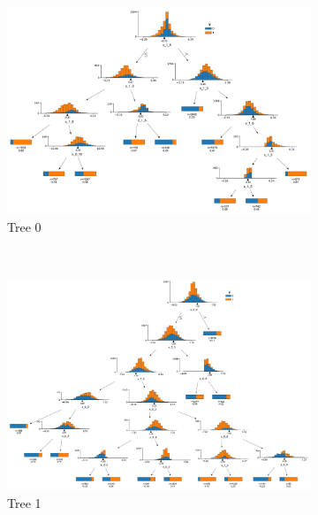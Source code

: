 \begin{landscape}
\begin{figure}[H]
  \centering
  \begin{subfigure}[b]{0.32\linewidth}\centering
      \includegraphics[width=\textwidth]{figures/ml/figs_demo/dtreeviz_figs_0}
  \caption{Tree 0}
  \label{fig:FIGS:demo_trees:tree0}
  \end{subfigure}
  ~
  \begin{subfigure}[b]{0.32\linewidth}\centering
      \includegraphics[width=\textwidth]{figures/ml/figs_demo/dtreeviz_figs_1}
  \caption{Tree 1}
  \label{fig:FIGS:demo_trees:tree1}
  \end{subfigure}
  ~
  \begin{subfigure}[b]{0.32\linewidth}\centering

\end{subfigure}
\end{figure}
\end{landscape}
